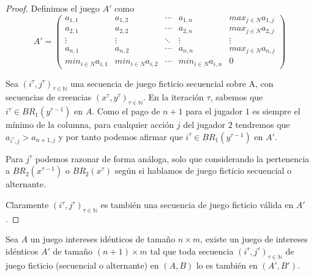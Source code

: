 \begin{proof}
    Definimos el juego $A'$ como
    \begin{equation*}
        A' =
        \begin{pmatrix}
        a_{1,1} & a_{1,2} & \cdots & a_{1,n} & max_{j \in N} a_{1,j}    \\
        a_{2,1} & a_{2,2} & \cdots & a_{2,n} & max_{j \in N} a_{2,j}    \\
        \vdots  & \vdots  & \ddots & \vdots  & \vdots                   \\
        a_{n,1} & a_{n,2} & \cdots & a_{n,n} & max_{j \in N} a_{n,j}    \\
        min_{i \in N} a_{i,1} & min_{i \in N} a_{i,2} & \cdots & min_{i \in N} a_{i,n}        & 0
        \end{pmatrix}
    \end{equation*} 

    Sea $(i^\tau, j^\tau)_{\tau \in \mathbb{N}}$ una secuencia de juego ficticio secuencial sobre A, con secuencias de creencias $(x^\tau, y^\tau)_{\tau \in \mathbb{N}}$. En la iteración $\tau$, sabemos que $i^\tau \in BR_1(y^{\tau - 1})$ en $A$. Como el pago de $n+1$ para el jugador $1$ es siempre el mínimo de la columna, para cualquier acción $j$ del jugador $2$ tendremos que $a_{i^\tau, j} > a_{n+1,j}$ y por tanto podemos afirmar que $i^\tau \in BR_1(y^{\tau - 1})$ en $A'$.

    Para $j^\tau$ podemos razonar de forma análoga, solo que considerando la pertenencia a $BR_2(x^{\tau - 1})$ o $BR_2(x^\tau)$ según si hablamos de juego ficticio secuencial o alternante.

    Claramente $(i^\tau, j^\tau)_{\tau \in \mathbb{N}}$ es también una secuencia de juego ficticio  válida en $A'$.
\end{proof}

\begin{lemma}
    Sea $A$ un juego intereses idénticos de tamaño $n \times m$, existe un juego de intereses idénticos $A'$ de tamaño $(n+1) \times m$ tal que toda secuencia $(i^\tau, j^\tau)_{\tau \in \mathbb{N}}$ de juego ficticio (secuencial o alternante) en $(A, B)$ lo es también en $(A', B')$.
\end{lemma}

